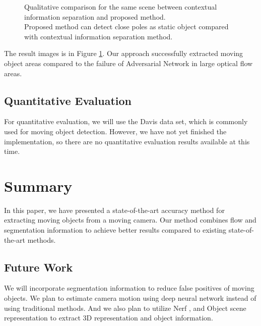 \documentclass[10pt, twocolumn]{article}
\begin{document}
\begin{figure}[ht]
  \caption{Qualitative comparison for the same scene between contextual information separation and proposed method.\\
  Proposed method can detect close poles as static object compared with contextual information separation method.}
  \label{fig:comparison}
\end{figure}

The result images is in Figure \ref{fig:comparison}.
Our approach successfully extracted moving object areas compared to the failure of Adversarial Network in large optical flow areas.


\subsection{Quantitative Evaluation}
For quantitative evaluation, we will use the Davis data set, which is commonly used for moving object detection.
However, we have not yet finished the implementation, so there are no quantitative evaluation results available at this time.


\section{Summary}
In this paper, we have presented a state-of-the-art accuracy method for extracting moving objects from a moving camera.
Our method combines flow and segmentation information to achieve better results compared to existing state-of-the-art methods.

\subsection{Future Work}
We will incorporate segmentation information to reduce false positives of moving objects.
We plan to estimate camera motion using deep neural network instead of using traditional methods.
And we also plan to utilize Nerf \cite{mildenhall2020nerf}, and Object scene representation to extract 3D representation and object information.




\end{document}
